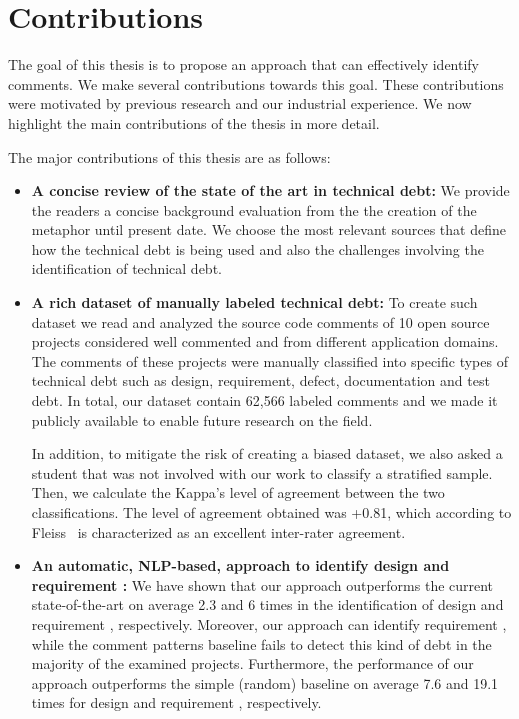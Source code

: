 \section{Contributions}

The goal of this thesis is to propose an approach that can effectively identify \SATD comments. We make several contributions towards this goal. These contributions were motivated by previous research and our industrial experience. We now highlight the main contributions of the thesis in more detail.


The major contributions of this thesis are as follows:
\begin{itemize}

\item \textbf{A concise review of the state of the art in technical debt:} We provide the readers a concise background evaluation from the the creation of the metaphor until present date. We choose the most relevant sources that define how the technical debt is being used and also the challenges involving the identification of technical debt.

\item \textbf{A rich dataset of manually labeled technical debt:} To create such dataset we read and analyzed the source code comments of 10 open source projects considered well commented and from different application domains. The comments of these projects were manually classified into specific types of technical debt such as design, requirement, defect, documentation and test debt. In total, our dataset contain 62,566 labeled comments and we made it publicly available to enable future research on the field. 

In addition, to mitigate the risk of creating a biased dataset, we also asked a student that was not involved with our work to classify a stratified sample. Then, we calculate the Kappa's level of agreement between the two classifications. The level of agreement obtained was +0.81, which according to Fleiss~\cite{Fleiss1981measurement} is characterized as an excellent inter-rater agreement.

\item \textbf{An automatic, NLP-based, approach to identify design and requirement \SATD:} We have shown that our approach outperforms the current state-of-the-art on average 2.3 and 6 times in the identification of design and requirement \SATD, respectively. Moreover, our approach can identify requirement \SATD, while the comment patterns baseline fails to detect this kind of debt in the majority of the examined projects. Furthermore, the performance of our approach outperforms the simple (random) baseline on average 7.6 and 19.1 times for design and requirement \SATD, respectively. 


\end{itemize}
